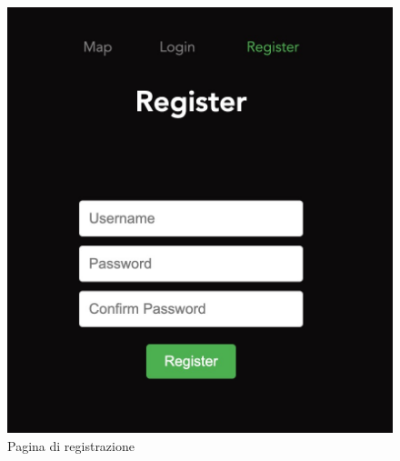 \begin{figure}[h]
    \centering
    \begin{minipage}{0.40\textwidth}
        \includegraphics[width=\textwidth]{images/Registrazione.jpg}
        \caption[Pagina di registrazione]{Pagina di registrazione}
        \label{fig:registrazione}
    \end{minipage}

    \vspace{0.6cm}


\end{figure}
